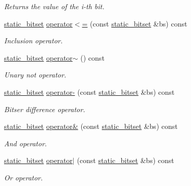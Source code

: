 \begin{DoxyCompactItemize}
\begin{DoxyCompactList}\small\item\em Returns the value of the i-\/th bit. \end{DoxyCompactList}\item 
\hyperlink{classlgraph_1_1utils_1_1static__bitset}{static\+\_\+bitset} \hyperlink{classlgraph_1_1utils_1_1static__bitset_a8c1e2397655865931a61dac90603e107}{operator$<$=} (const \hyperlink{classlgraph_1_1utils_1_1static__bitset}{static\+\_\+bitset} \&bs) const 
\begin{DoxyCompactList}\small\item\em Inclusion operator. \end{DoxyCompactList}\item 
\hyperlink{classlgraph_1_1utils_1_1static__bitset}{static\+\_\+bitset} \hyperlink{classlgraph_1_1utils_1_1static__bitset_a1cbeed2b62a4b9fe5eecf61d498a39ae}{operator$\sim$} () const 
\begin{DoxyCompactList}\small\item\em Unary not operator. \end{DoxyCompactList}\item 
\hyperlink{classlgraph_1_1utils_1_1static__bitset}{static\+\_\+bitset} \hyperlink{classlgraph_1_1utils_1_1static__bitset_a9042acb0366c5a9bfe0dc629b3bdd08a}{operator-\/} (const \hyperlink{classlgraph_1_1utils_1_1static__bitset}{static\+\_\+bitset} \&bs) const 
\begin{DoxyCompactList}\small\item\em Bitser difference operator. \end{DoxyCompactList}\item 
\hyperlink{classlgraph_1_1utils_1_1static__bitset}{static\+\_\+bitset} \hyperlink{classlgraph_1_1utils_1_1static__bitset_a312e62c57a19b230fae738aadd184df0}{operator\&} (const \hyperlink{classlgraph_1_1utils_1_1static__bitset}{static\+\_\+bitset} \&bs) const 
\begin{DoxyCompactList}\small\item\em And operator. \end{DoxyCompactList}\item 
\hyperlink{classlgraph_1_1utils_1_1static__bitset}{static\+\_\+bitset} \hyperlink{classlgraph_1_1utils_1_1static__bitset_a08f50dadf7a22b4372e8d7e1d57c0670}{operator$\vert$} (const \hyperlink{classlgraph_1_1utils_1_1static__bitset}{static\+\_\+bitset} \&bs) const 
\begin{DoxyCompactList}\small\item\em Or operator. \end{DoxyCompactList}\item 

\end{DoxyCompactItemize}
